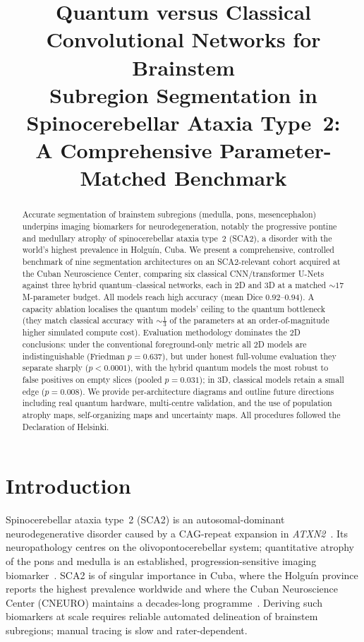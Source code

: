 \documentclass[runningheads]{llncs}
\title{Quantum versus Classical Convolutional Networks for Brainstem\\
Subregion Segmentation in Spinocerebellar Ataxia Type~2:\\
A Comprehensive Parameter-Matched Benchmark}
\author{\todo{Author One}\inst{1} \and \todo{Author Two}\inst{1} \and \todo{Senior Author}\inst{1}}
\institute{Cuban Neuroscience Center (CNEURO), Havana, Cuba\\
\email{\todo{corresponding@email}}}
\begin{document}
\maketitle

\begin{abstract}
Accurate segmentation of brainstem subregions (medulla, pons, mesencephalon)
underpins imaging biomarkers for neurodegeneration, notably the progressive
pontine and medullary atrophy of spinocerebellar ataxia type~2 (SCA2), a
disorder with the world's highest prevalence in Holgu\'in, Cuba. We present a
comprehensive, controlled benchmark of nine segmentation architectures on an
SCA2-relevant cohort acquired at the Cuban Neuroscience Center, comparing six
classical CNN/transformer U-Nets against three hybrid quantum--classical
networks, each in 2D and 3D at a matched ${\sim}17$M-parameter budget. All
models reach high accuracy (mean Dice $0.92$--$0.94$). A capacity ablation
localises the quantum models' ceiling to the quantum bottleneck (they match
classical accuracy with ${\sim}\tfrac13$ of the parameters at an
order-of-magnitude higher simulated compute cost). Evaluation methodology
dominates the 2D conclusions: under the conventional foreground-only metric all
2D models are indistinguishable (Friedman $p{=}0.637$), but under honest
full-volume evaluation they separate sharply ($p{<}0.0001$), with the hybrid
quantum models the most robust to false positives on empty slices (pooled
$p{=}0.031$); in 3D, classical models retain a small edge ($p{=}0.008$). We
provide per-architecture diagrams and outline future directions including real
quantum hardware, multi-centre validation, and the use of population atrophy
maps, self-organizing maps and uncertainty maps. All procedures followed the
Declaration of Helsinki.
\end{abstract}

\section{Introduction}
Spinocerebellar ataxia type~2 (SCA2) is an autosomal-dominant neurodegenerative
disorder caused by a CAG-repeat expansion in \emph{ATXN2}~\cite{pulst}. Its
neuropathology centres on the olivopontocerebellar system; quantitative atrophy
of the pons and medulla is an established, progression-sensitive imaging
biomarker~\cite{velazquez}. SCA2 is of singular importance in Cuba, where the
Holgu\'in province reports the highest prevalence worldwide and where the Cuban
Neuroscience Center (CNEURO) maintains a decades-long programme~\cite{velazquez}.
Deriving such biomarkers at scale requires reliable automated delineation of
brainstem subregions; manual tracing is slow and rater-dependent.
\end{document}
